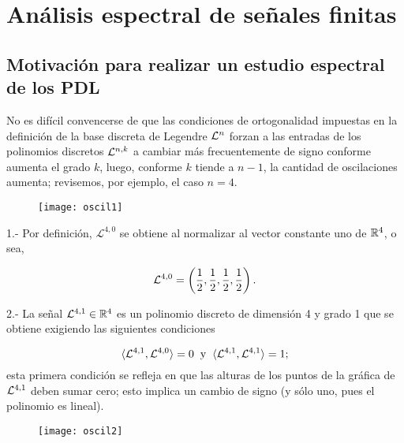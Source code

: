 \chapter{Análisis espectral de señales finitas}
\label{chap: estudio espectral}


\section{Motivación para realizar un estudio espectral de los PDL}
No es difícil convencerse de que las condiciones de ortogonalidad
impuestas en la definición de la base discreta de Legendre
$\mathcal{L}^{n}$
forzan a las entradas de los polinomios discretos $\mathcal{L}^{n,k}$
a cambiar más frecuentemente de signo conforme aumenta
el grado $k$, luego, conforme $k$ tiende a $n-1$,
la cantidad de oscilaciones aumenta; revisemos, 
por ejemplo, el caso $n=4$.



\begin{minipage}{0.5\textwidth}
\begin{figure}[H]
\texttt{[image: oscil1]}
\end{figure}
\end{minipage} \hfill
\begin{minipage}{0.45\textwidth}
1.- Por definición,
$\mathcal{L}^{4,0}$ se obtiene al normalizar 
al vector constante uno de $\mathbb{R}^{4}$, o sea, 

\[
\mathcal{L}^{4,0} = \left(
\frac{1}{2}, \frac{1}{2}, \frac{1}{2}, \frac{1}{2}
\right).
\]
\end{minipage} 


\begin{minipage}{0.5\textwidth}
2.- La señal $\mathcal{L}^{4,1} \in \mathbb{R}^{4}$ es un polinomio discreto de
dimensión 4 y grado 1 que se obtiene exigiendo las
siguientes condiciones

\[
\langle \mathcal{L}^{4,1} , \mathcal{L}^{4,0} \rangle=0
\hspace{0.2cm} \text{y} \hspace{0.2cm}
\langle \mathcal{L}^{4,1} , \mathcal{L}^{4,1} \rangle=1;
\]
esta primera condición se refleja en que 
las alturas de los puntos de la gráfica de 
$\mathcal{L}^{4,1}$ deben sumar cero;
esto implica un cambio de signo (y sólo uno,
pues el polinomio es lineal).

\end{minipage} \hfill
\begin{minipage}{0.45\textwidth}
\begin{figure}[H]
\texttt{[image: oscil2]}
\end{figure}
\end{minipage}

